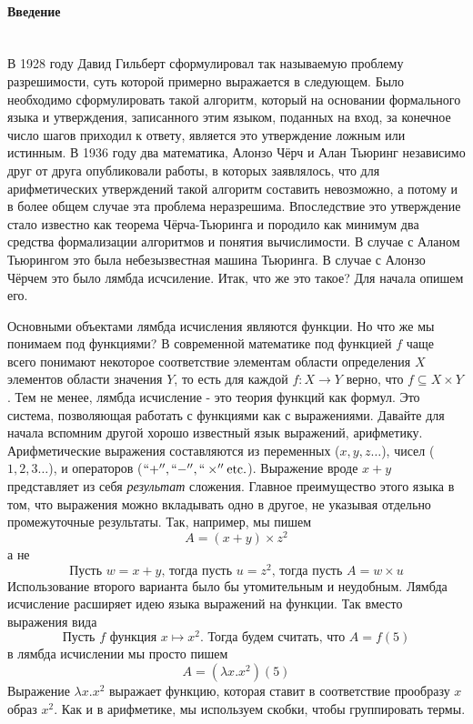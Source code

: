 \documentclass[lambda.tex]{subfiles}
\begin{document}
\paragraph{Введение} ~\\

В 1928 году Давид Гильберт сформулировал так называемую проблему разрешимости, суть которой примерно выражается в следующем. Было необходимо сформулировать такой алгоритм, который на основании формального языка и утверждения, записанного этим языком, поданных на вход, за конечное число шагов приходил к ответу, является это утверждение ложным или истинным. В 1936 году два математика, Алонзо Чёрч и Алан Тьюринг независимо друг от друга опубликовали работы, в которых заявлялось, что для арифметических утверждений такой алгоритм составить невозможно, а потому и в более общем случае эта проблема неразрешима. Впоследствие это утверждение стало известно как теорема Чёрча-Тьюринга и породило как минимум два средства формализации алгоритмов и понятия вычислимости. В случае с Аланом Тьюрингом это была небезызвестная машина Тьюринга. В случае с Алонзо Чёрчем это было лямбда исчсиление. Итак, что же это такое? Для начала опишем его.

Основными объектами лямбда исчисления являются функции. Но что же мы понимаем под функциями? В современной математике под функцией $f$ чаще всего понимают некоторое соответствие элементам области определения $X$ элементов области значения $Y$, то есть для каждой $f:X \rightarrow Y$ верно, что $f \subseteq X \times Y$. Тем не менее, лямбда исчисление - это теория функций как формул. Это система, позволяющая работать с функциями как с выражениями.
Давайте для начала вспомним другой хорошо известный язык выражений, арифметику. Арифметические выражения составляются из переменных ($x,y,z\dots$), чисел ($1,2,3\dots$), и операторов ($``+'',``-'',``\times''\text{etc.}$). Выражение вроде $x+y$ представляет из себя \emph{результат} сложения. Главное преимущество этого языка в том, что выражения можно вкладывать одно в другое, не указывая отдельно промежуточные результаты. Так, например, мы пишем
\[A=(x+y) \times z^2\]
а не
\[\text{Пусть }w=x+y\text{, тогда пусть }u=z^2 \text{, тогда пусть }A=w \times u\]
Использование второго варианта было бы утомительным и неудобным.
Лямбда исчисление расширяет идею языка выражений на функции. Так вместо выражения вида
\[\text{Пусть } f \text{ функция } x \mapsto x^2 \text{. Тогда будем считать, что } A=f(5)\]
в лямбда исчислении мы просто пишем
\[A=(\lambda x.x^2)(5)\]
Выражение $\lambda x.x^2$ выражает функцию, которая ставит в соответствие прообразу $x$ образ $x^2$. Как и в арифметике, мы используем скобки, чтобы группировать термы.
\end{document}
